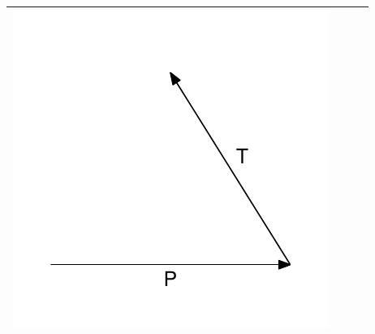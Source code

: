 \documentclass[
  12pt
]{scrartcl}
\begin{document}
\begin{center}
\begin{longtable}{m{}m{}m{}m{}}
  \includegraphics[width = \linewidth]{../fig/TP_iso.pdf}  \\
  \bottomrule
  \end{longtable}
\end{center}

\clearpage
\end{document}
